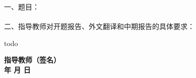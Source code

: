 
\newpage
\thispagestyle{empty}

{

\begin{tabbing}
\hspace{5mm}\songti\sihao 一、题目：\underline{\makebox[12cm]{\zjutitlec}}
\\ \\
\hspace{5mm}\songti\sihao 二、指导教师对开题报告、外文翻译和中期报告的具体要求：
\end{tabbing}
}

{
\sihao
\setlength{\parindent}{2.1em}
todo
}


{
\vspace{90mm}

\begin{flushright}
    \textbf{指导教师（签名）\;\underline{\hspace{8em}}}\\
    \textbf{年 \quad 月 \quad 日}
\end{flushright}
}

